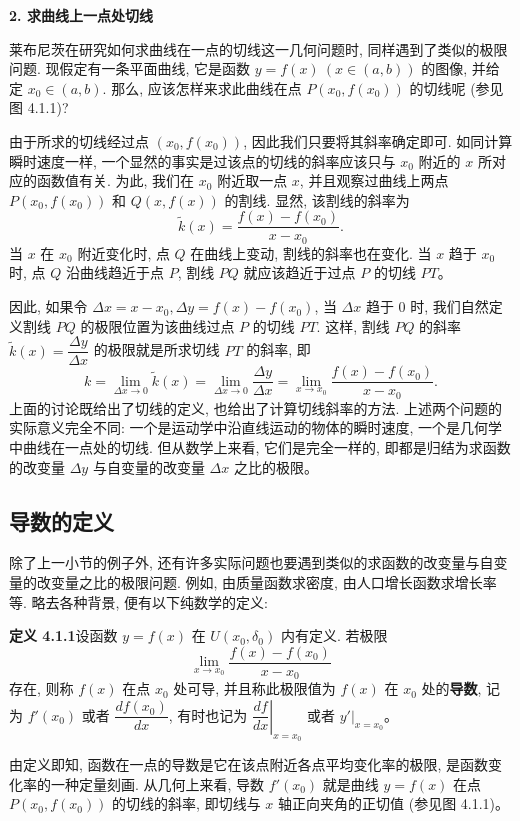 \documentclass[UTF8, 12pt, fontset=fandol, oneside]{ctexart}
\begin{document}
\noindent\textbf{2. 求曲线上一点处切线}

莱布尼茨在研究如何求曲线在一点的切线这一几何问题时, 同样遇到了类似的极限问题. 现假定有一条平面曲线, 它是函数 $y=f(x)\ (x\in(a,b))$ 的图像, 并给定 $x_0\in(a,b)$. 那么, 应该怎样来求此曲线在点 $P(x_0,f(x_0))$ 的切线呢 (参见图 4.1.1)?

由于所求的切线经过点 $(x_0,f(x_0))$, 因此我们只要将其斜率确定即可. 如同计算瞬时速度一样, 一个显然的事实是过该点的切线的斜率应该只与 $x_0$ 附近的 $x$ 所对应的函数值有关. 为此, 我们在 $x_0$ 附近取一点 $x$, 并且观察过曲线上两点 $P(x_0,f(x_0))$ 和 $Q(x,f(x))$ 的割线. 显然, 该割线的斜率为
\[
  \tilde{k}(x)=\frac{f(x)-f(x_0)}{x-x_0}.
\]
当 $x$ 在 $x_0$ 附近变化时, 点 $Q$ 在曲线上变动, 割线的斜率也在变化. 当 $x$ 趋于 $x_0$ 时, 点 $Q$ 沿曲线趋近于点 $P$, 割线 $PQ$ 就应该趋近于过点 $P$ 的切线 $PT$。

因此, 如果令 $\Delta x=x-x_0,\Delta y=f(x)-f(x_0)$, 当 $\Delta x$ 趋于 $0$ 时, 我们自然定义割线 $PQ$ 的极限位置为该曲线过点 $P$ 的切线 $PT$. 这样, 割线 $PQ$ 的斜率 $\tilde{k}(x)=\dfrac{\Delta y}{\Delta x}$ 的极限就是所求切线 $PT$ 的斜率, 即
\[
  k=
  \lim_{\Delta x\to0}\tilde{k}(x)
  =
  \lim_{\Delta x\to0}\frac{\Delta y}{\Delta x}
  =
  \lim_{x\to x_0}\frac{f(x)-f(x_0)}{x-x_0}.
\]
上面的讨论既给出了切线的定义, 也给出了计算切线斜率的方法. 上述两个问题的实际意义完全不同: 一个是运动学中沿直线运动的物体的瞬时速度, 一个是几何学中曲线在一点处的切线. 但从数学上来看, 它们是完全一样的, 即都是归结为求函数的改变量 $\Delta y$ 与自变量的改变量 $\Delta x$ 之比的极限。

\subsection{导数的定义}

除了上一小节的例子外, 还有许多实际问题也要遇到类似的求函数的改变量与自变量的改变量之比的极限问题. 例如, 由质量函数求密度, 由人口增长函数求增长率等. 略去各种背景, 便有以下纯数学的定义:

\noindent\textbf{定义 4.1.1}\quad 设函数 $y=f(x)$ 在 $U(x_0,\delta_0)$ 内有定义. 若极限
\[
  \lim_{x\to x_0}\frac{f(x)-f(x_0)}{x-x_0}
\]
存在, 则称 $f(x)$ 在点 $x_0$ 处可导, 并且称此极限值为 $f(x)$ 在 $x_0$ 处的\textbf{导数}, 记为 $f'(x_0)$ 或者 $\dfrac{df(x_0)}{dx}$, 有时也记为 $\left.\dfrac{df}{dx}\right|_{x=x_0}$ 或者 $\left.y'\right|_{x=x_0}$。

由定义即知, 函数在一点的导数是它在该点附近各点平均变化率的极限, 是函数变化率的一种定量刻画. 从几何上来看, 导数 $f'(x_0)$ 就是曲线 $y=f(x)$ 在点 $P(x_0,f(x_0))$ 的切线的斜率, 即切线与 $x$ 轴正向夹角的正切值 (参见图 4.1.1)。
\end{document}
